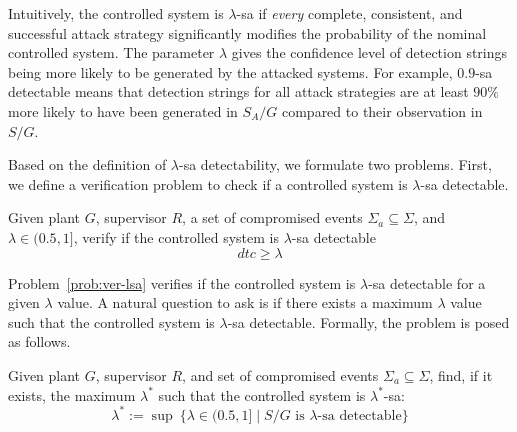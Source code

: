 Intuitively, the controlled system is $\lambda$-sa if \emph{every} complete, consistent, and successful attack strategy significantly modifies the probability of the nominal controlled system.
The parameter $\lambda$ gives the confidence level of detection strings being more likely to be generated by the attacked systems.
For example, $0.9$-sa detectable means that detection strings for all attack strategies are at least $90\%$ more likely to have been generated in $S_A/G$ compared to their observation in $S/G$.



Based on the definition of $\lambda$-sa detectability, we formulate two problems.
First, we define a verification problem to check if a controlled system is $\lambda$-sa detectable.

\begin{problem}\label{prob:ver-lsa}
Given plant $G$, supervisor $R$, a set of compromised events $\Sigma_a\subseteq \Sigma$, and $\lambda \in (0.5,1]$, verify if the controlled system is $\lambda$-sa detectable
\[dtc \geq\lambda\]
\end{problem} 

Problem~\ref{prob:ver-lsa} verifies if the controlled system is $\lambda$-sa detectable for a given $\lambda$ value.
A natural question to ask is if there exists a maximum $\lambda$ value such that the controlled system is $\lambda$-sa detectable.
Formally, the problem is posed as follows.
\begin{problem}\label{prob:optimal-lsa}
Given plant $G$, supervisor $R$, and set of compromised events $\Sigma_a\subseteq \Sigma$, find, if it exists, the maximum $\lambda^*$ such that the controlled system is $\lambda^*$-sa: 
$$\lambda^* := \sup\ \{\lambda\in (0.5,1] \mid S/G \text{ is } \lambda\text{-sa detectable}\}$$
\end{problem}


